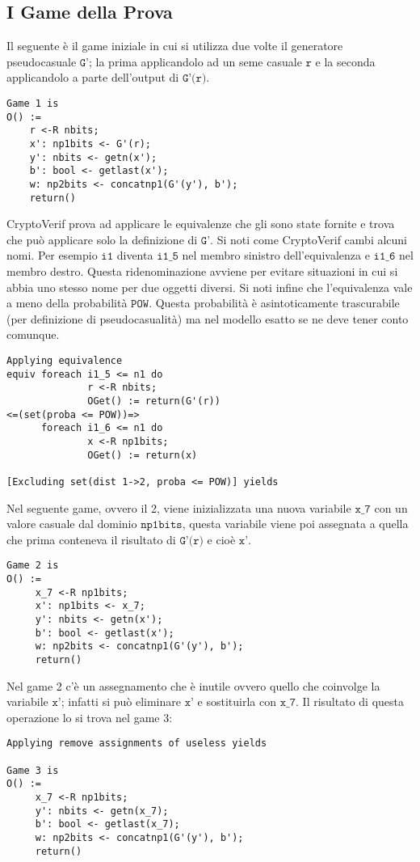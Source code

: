 \documentclass[a4paper,openright,twoside,12pt]{report}
\begin{document}
\subsection{I Game della Prova}
Il seguente \`e il game iniziale in cui si utilizza due volte il generatore pseudocasuale $\texttt{G'}$; 
la prima applicandolo ad un seme casuale $\texttt{r}$ e la seconda applicandolo a parte dell'output di $\texttt{G'(r)}$.
\begin{verbatim}
Game 1 is
O() :=
    r <-R nbits;
    x': np1bits <- G'(r);
    y': nbits <- getn(x');
    b': bool <- getlast(x');
    w: np2bits <- concatnp1(G'(y'), b');
    return()
\end{verbatim}
CryptoVerif prova ad applicare le equivalenze che gli sono state fornite e trova che pu\`o applicare solo la definizione di $\texttt{G'}$.
Si noti come CryptoVerif cambi alcuni nomi. Per esempio $\texttt{i1}$ diventa $\texttt{i1\_5}$ nel membro sinistro dell'equivalenza e $\texttt{i1\_6}$ nel membro destro.
Questa ridenominazione avviene per evitare situazioni in cui si abbia uno stesso nome per due oggetti diversi. 
Si noti infine che l'equivalenza vale a meno della probabilit\`a $\texttt{POW}$. Questa probabilit\`a \`e asintoticamente trascurabile (per definizione di pseudocasualit\`a)
ma nel modello esatto se ne deve tener conto comunque.
\begin{verbatim}
Applying equivalence
equiv foreach i1_5 <= n1 do 
              r <-R nbits; 
              OGet() := return(G'(r))
<=(set(proba <= POW))=>
      foreach i1_6 <= n1 do 
              x <-R np1bits; 
              OGet() := return(x)

[Excluding set(dist 1->2, proba <= POW)] yields
\end{verbatim}
Nel seguente game, ovvero il 2, viene inizializzata una nuova variabile $\texttt{x\_7}$ con un valore casuale dal dominio  $\texttt{np1bits}$, questa variabile viene poi assegnata a quella che prima
conteneva il risultato di $\texttt{G'(r)}$ e cio\`e $\texttt{x'}$.
\begin{verbatim} 
Game 2 is
O() :=
     x_7 <-R np1bits; 
     x': np1bits <- x_7;
     y': nbits <- getn(x');
     b': bool <- getlast(x');
     w: np2bits <- concatnp1(G'(y'), b');
     return()
\end{verbatim}
Nel game 2 c'\`e un assegnamento che \`e inutile ovvero quello che coinvolge la variabile $\texttt{x'}$; infatti si pu\`o eliminare  $\texttt{x'}$ e sostituirla con  $\texttt{x\_7}$. 
Il risultato di questa operazione lo si trova nel game 3:
\begin{verbatim} 
Applying remove assignments of useless yields

Game 3 is
O() :=
     x_7 <-R np1bits;
     y': nbits <- getn(x_7);
     b': bool <- getlast(x_7);
     w: np2bits <- concatnp1(G'(y'), b');
     return()
\end{verbatim}
\end{document}
